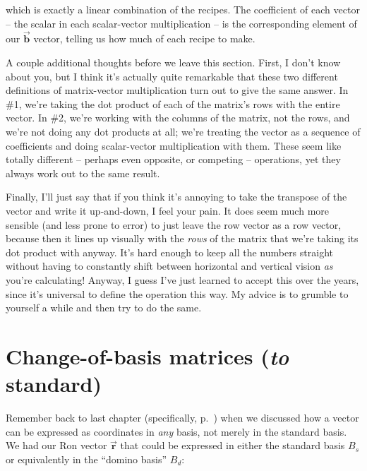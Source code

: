 which is exactly a linear combination of the recipes. The coefficient of each
vector -- the scalar in each scalar-vector multiplication -- is the
corresponding element of our $\overrightarrow{\textbf{b}}$ vector, telling us
how much of each recipe to make.

\bigskip

A couple additional thoughts before we leave this section. First, I don't know
about you, but I think it's actually quite remarkable that these two different
definitions of matrix-vector multiplication turn out to give the same answer.
In \#1, we're taking the dot product of each of the matrix's rows with the
entire vector. In \#2, we're working with the columns of the matrix, not the
rows, and we're not doing any dot products at all; we're treating the vector as
a sequence of coefficients and doing scalar-vector multiplication with them.
These seem like totally different -- perhaps even opposite, or competing --
operations, yet they always work out to the same result.

Finally, I'll just say that if you think it's annoying to take the transpose of
the vector and write it up-and-down, I feel your pain. It does seem much more
sensible (and less prone to error) to just leave the row vector as a row
vector, because then it lines up visually with the \textit{rows} of the matrix
that we're taking its dot product with anyway. It's hard enough to keep all the
numbers straight without having to constantly shift between horizontal and
vertical vision \textit{as} you're calculating! Anyway, I guess I've just
learned to accept this over the years, since it's universal to define the
operation this way. My advice is to grumble to yourself a while and then try to
do the same.

\section{Change-of-basis matrices (\textit{to} standard)}

\label{changeOfBasisMatrix}

Remember back to last chapter (specifically, p.~\pageref{changeOfBasis}) when we
discussed how a vector can be expressed as coordinates in \textit{any} basis,
not merely in the standard basis. We had our Ron vector
$\overrightarrow{\textbf{r}}$ that could be expressed in either the standard
basis $B_s$ or equivalently in the ``domino basis'' $B_d$:

